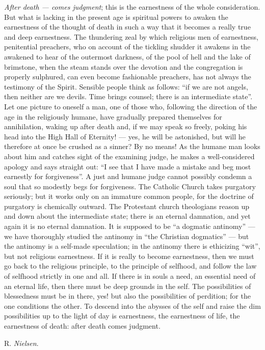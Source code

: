 \documentclass[12pt,a4paper,openany]{book}
\newcommand{\opage}[1]{\marginnote{\footnotesize\textit{[#1]}}}
\newcommand{\signature}[1]{\par\smallskip\hfill #1\hspace*{2em}\par}
\begin{document}
\emph{After death --- comes judgment}; this is the earnestness of
the whole consideration.  But what is lacking in the present age
is spiritual powers to awaken the earnestness of the thought of death
in such a way that it becomes a really true and deep
earnestness.  The thundering zeal by which religious men of earnestness,
penitential preachers, who on account of the tickling shudder
it awakens in the awakened to hear of the outermost darkness,
of the pool of hell and the lake of brimstone, when the steam stands over
the devotion and the congregation is properly sulphured, can even
become fashionable preachers, has not always the testimony of the Spirit.
Sensible people think as follows: ``if we are not
angels, then neither are we devils.  Time brings counsel;
there is an intermediate state''.  Let one picture
to oneself a man, one of those who, following the direction of the age
in the religiously humane, have gradually prepared
themselves for annihilation, waking up after death and,
if we may speak so freely, poking his head into the High Hall
\setcounter{footnote}{0}%
\opage{223}of Eternity! --- yes, he will be astonished, but will he therefore
at once be crushed as a sinner?  By no means!  As the
humane man looks about him and catches sight of the examining judge,
he makes a well-considered apology and says
straight out: ``I see that I have made a mistake and beg most earnestly for
forgiveness''.  A just and humane judge cannot possibly
condemn a soul that so modestly begs for forgiveness.
The Catholic Church takes purgatory seriously;
but it works only on an immature common people, for the doctrine
of purgatory is chemically outward.  The Protestant church theologians
reason up and down about the intermediate state; there
is an eternal damnation, and yet again it is no
eternal damnation.  It is supposed to be ``a dogmatic antinomy''
--- we have thoroughly studied the antinomy in ``the
Christian dogmatics'' --- but the antinomy is a self-made
speculation; in the antinomy there is ethicizing ``wit'',
but not religious earnestness.  If it is really to become
earnestness, then we must go back to the religious principle,
to the principle of selfhood, and follow the law of selfhood strictly in one
and all.  If there is in souls a need, an essential need of an
eternal life, then there must be deep grounds in the self.  The possibilities
of blessedness must be in there, yes! but also
the possibilities of perdition; for the one conditions the other.
To descend into the abysses of the self and raise the dim possibilities
up to the light of day is earnestness, the earnestness of life, the earnestness
of death: after death comes judgment.
\signature{R. \emph{Nielsen}.}
\end{document}
